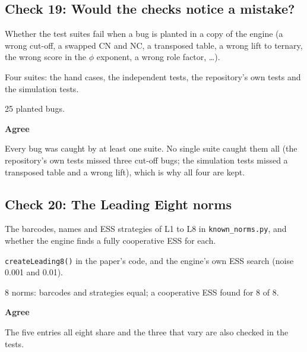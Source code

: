 \subsection*{Check 19: Would the checks notice a mistake?}

\begin{description}\setlength\itemsep{0pt}

\item[What was checked] Whether the test suites fail when a bug is planted in a copy of the engine (a wrong cut-off, a swapped CN and NC, a transposed table, a wrong lift to ternary, the wrong score in the $\phi$ exponent, a wrong role factor, \dots).

\item[Checked against] Four suites: the hand cases, the independent tests, the repository's own tests and the simulation tests.

\item[How many] 25 planted bugs.

\item[Result] \textbf{Agree}

\item[Note] Every bug was caught by at least one suite. No single suite caught them all (the repository's own tests missed three cut-off bugs; the simulation tests missed a transposed table and a wrong lift), which is why all four are kept.

\end{description}


\subsection*{Check 20: The Leading Eight norms}

\begin{description}\setlength\itemsep{0pt}

\item[What was checked] The barcodes, names and ESS strategies of L1 to L8 in \texttt{known\_norms.py}, and whether the engine finds a fully cooperative ESS for each.

\item[Checked against] \texttt{createLeading8()} in the paper's code, and the engine's own ESS search (noise 0.001 and 0.01).

\item[How many] 8 norms: barcodes and strategies equal; a cooperative ESS found for 8 of 8.

\item[Result] \textbf{Agree}

\item[Note] The five entries all eight share and the three that vary are also checked in the tests.

\end{description}


